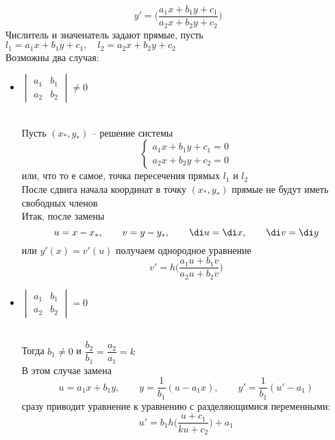 $$ y' = \bigg( \frac{a_1x + b_1y + c_1}{a_2x + b_2y + c_2} \bigg) $$
Числитель и значенатель задают прямые, пусть $ l_1 = a_1x + b_1y + c_1, \quad l_2 = a_2x + b_2y + c_2 $ \\
Возможны два случая:
\begin{itemize}
    \item $
    \begin{vmatrix}
        a_1 & b_1 \\
        a_2 & b_2
    \end{vmatrix} \ne 0 $
    \begin{figure}[!ht]
    \end{figure} \\
    Пусть $ (x_*, y_*) $ -- решение системы
    $$
    \begin{cases}
        a_1x + b_1y + c_1 = 0 \\
        a_2x + b_2y + c_2 = 0
    \end{cases} $$
    или, что то е самое, точка пересечения прямых $ l_1 $ и $ l_2 $ \\
    После сдвига начала координат в точку $ (x_*, y_*) $ прямые не будут иметь свободных членов \\
    Итак, после замены
    $$ u = x - x_*, \qquad v = y - y_*, \qquad \di u = \di x, \qquad \di v = \di y $$
    или $ y'(x) = v'(u) $ получаем однородное уравнение
    $$ v' = h \bigg( \frac{a_1u + b_1v}{a_2u + b_2v} \bigg) $$
    \item $
    \begin{vmatrix}
        a_1 & b_1 \\
        a_2 & b_2
    \end{vmatrix} = 0 $
    \begin{figure}[!ht]
    \end{figure} \\
    Тогда $ b_1 \ne 0 $ и $ \dfrac{b_2}{b_1} = \dfrac{a_2}{a_1} = k $ \\
    В этом случае замена
    $$ u = a_1x + b_1y, \qquad y = \frac1{b_1}(u - a_1x), \qquad y' = \frac1{b_1}(u' - a_1) $$
    сразу приводит уравнение к уравнению с разделяющимися переменными:
    $$ u' = b_1h \bigg( \frac{u + c_1}{ku + c_2} \bigg) + a_1 $$
\end{itemize}

